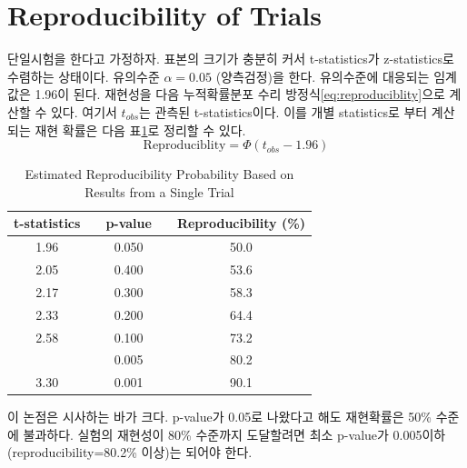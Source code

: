 \section{Reproducibility of Trials}
단일시험을 한다고 가정하자. 표본의 크기가 충분히 커서 t-statistics가 z-statistics로 수렴하는 상태이다. 유의수준 $\alpha=0.05$ (양측검정)을 한다. 유의수준에 대응되는 임계값은 1.96이 된다. 재현성을 다음 누적확률분포 수리 방정식\ref{eq:reproduciblity}으로 계산할 수 있다. 여기서 $t_{obs}$는 관측된 t-statistics이다. 이를 개별 statistics로 부터 계산되는 재현 확률은 다음 표\ref{tab:reproducibility}로 정리할 수 있다.
\begin{equation}
\label{eq:reproduciblity}
    \text{Reproduciblity} =\Phi(t_{obs} - 1.96)
\end{equation}

\begin{table}[h]
    \centering
    \caption{Estimated Reproducibility Probability Based on Results from a Single Trial}
    \label{tab:reproducibility}
    \setlength{\tabcolsep}{28pt}
    \begin{tabular}{ccccc}
    \toprule
    \textbf{t-statistics} & \textbf{} & \textbf{p-value} & \textbf{} & \textbf{Reproducibility (\%)} \\ \midrule
    1.96                  &           & 0.050            &           & 50.0                    \\
    2.05                  &           & 0.400            &           & 53.6                    \\
    2.17                  &           & 0.300            &           & 58.3                    \\
    2.33                  &           & 0.200            &           & 64.4                    \\
    2.58                  &           & 0.100            &           & 73.2                    \\ \hdashline
    2.81                  &           & 0.005            &           & 80.2                    \\
    3.30                  &           & 0.001            &           & 90.1                    \\ \bottomrule
    \end{tabular}
\end{table}

\noindent
이 논점은 시사하는 바가 크다. p-value가 0.05로 나왔다고 해도 재현확률은 50\% 수준에 불과하다. 실험의 재현성이 80\% 수준까지 도달할려면 최소 p-value가 0.005이하 (reproducibility=80.2\% 이상)는 되어야 한다. 


